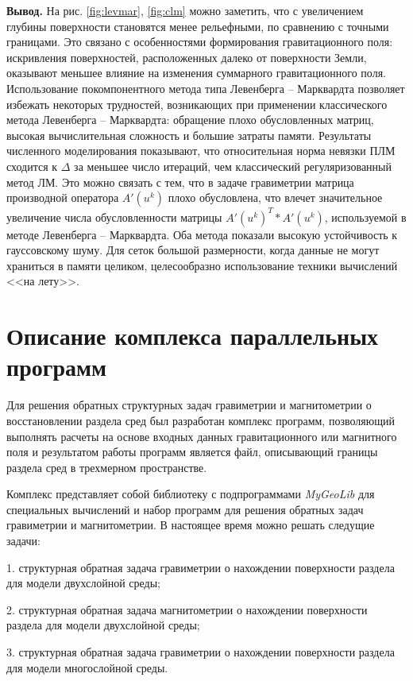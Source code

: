 {\bfseries\large Вывод.} На рис. \ref{fig:levmar}, \ref{fig:clm} можно заметить, что с увеличением глубины поверхности становятся менее рельефными, по сравнению с точными границами. Это связано с особенностями формирования гравитационного поля: искривления поверхностей, расположенных далеко от поверхности Земли, оказывают меньшее влияние на изменения суммарного гравитационного поля. Использование покомпонентного метода типа Левенберга -- Марквардта позволяет избежать некоторых трудностей, возникающих при применении классического метода Левенберга -- Марквардта: обращение плохо обусловленных матриц, высокая вычислительная сложность и большие затраты памяти. Результаты численного моделирования показывают, что относительная норма невязки ПЛМ сходится к $\Delta$ за меньшее число итераций, чем классический регуляризованный метод ЛМ. Это можно связать с тем, что в задаче гравиметрии матрица производной оператора $A'(u^k)$ плохо обусловлена, что влечет значительное увеличение числа обусловленности матрицы $A'(u^k)^T*A'(u^k)$, используемой в методе Левенберга -- Марквардта. Оба метода показали высокую устойчивость к гауссовскому шуму. Для сеток большой размерности, когда данные не могут храниться в памяти целиком, целесообразно использование техники вычислений <<на лету>>.

\newpage
\section{Описание комплекса параллельных программ}

Для решения обратных структурных задач гравиметрии и магнитометрии о восстановлении раздела сред был разработан комплекс программ, позволяющий выполнять расчеты на основе входных данных гравитационного или магнитного поля и результатом работы программ является файл, описывающий границы раздела сред в трехмерном пространстве.

Комплекс представляет собой библиотеку с подпрограммами \textit{MyGeoLib} для специальных вычислений и набор программ для решения обратных задач гравиметрии и магнитометрии. В настоящее время можно решать следущие задачи:

1. структурная обратная задача гравиметрии о нахождении поверхности раздела для модели двухслойной среды;

2. структурная обратная задача магнитометрии о нахождении поверхности раздела для модели двухслойной среды;

3. структурная обратная задача гравиметрии о нахождении поверхности раздела для модели многослойной среды.

